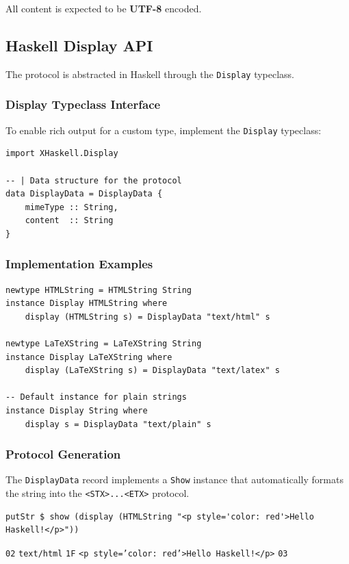 \documentclass[11pt]{scrartcl}
\begin{document}
All content is expected to be \textbf{UTF-8} encoded.
\subsection{Haskell Display API}


The protocol is abstracted in Haskell through the \texttt{Display} typeclass.
\subsubsection{Display Typeclass Interface}


To enable rich output for a custom type, implement the \texttt{Display} typeclass:
\begin{verbatim}
import XHaskell.Display

-- | Data structure for the protocol
data DisplayData = DisplayData {
    mimeType :: String,
    content  :: String
}
\end{verbatim}


\subsubsection{Implementation Examples}


\begin{verbatim}
newtype HTMLString = HTMLString String
instance Display HTMLString where
    display (HTMLString s) = DisplayData "text/html" s

newtype LaTeXString = LaTeXString String
instance Display LaTeXString where
    display (LaTeXString s) = DisplayData "text/latex" s

-- Default instance for plain strings
instance Display String where
    display s = DisplayData "text/plain" s
\end{verbatim}


\subsubsection{Protocol Generation}


The \texttt{DisplayData} record implements a \texttt{Show} instance that automatically formats the string into the \texttt{<STX>...<ETX>} protocol.
\begin{verbatim}
putStr $ show (display (HTMLString "<p style='color: red'>Hello Haskell!</p>"))
\end{verbatim}


\texttt{02} \texttt{text/html} \texttt{1F} \texttt{<p style='color: red'>Hello Haskell!</p>} \texttt{03}
\end{document}
